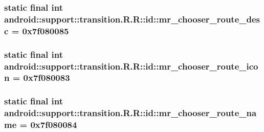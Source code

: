 \hypertarget{classandroid_1_1support_1_1transition_1_1_r_1_1id_6a5714f4a260e462ed4ed7c9c2356caa}{
\subsubsection[{mr\_\-chooser\_\-route\_\-desc}]{\setlength{\rightskip}{0pt plus 5cm}static final int android::support::transition.R.R::id::mr\_\-chooser\_\-route\_\-desc = 0x7f080085}}
\label{classandroid_1_1support_1_1transition_1_1_r_1_1id_6a5714f4a260e462ed4ed7c9c2356caa}


\hypertarget{classandroid_1_1support_1_1transition_1_1_r_1_1id_eb9712c8d46b22e7778bfad17cf43494}{
\subsubsection[{mr\_\-chooser\_\-route\_\-icon}]{\setlength{\rightskip}{0pt plus 5cm}static final int android::support::transition.R.R::id::mr\_\-chooser\_\-route\_\-icon = 0x7f080083}}
\label{classandroid_1_1support_1_1transition_1_1_r_1_1id_eb9712c8d46b22e7778bfad17cf43494}


\hypertarget{classandroid_1_1support_1_1transition_1_1_r_1_1id_221e09f6c2f01310f7316607ffb4cf28}{
\subsubsection[{mr\_\-chooser\_\-route\_\-name}]{\setlength{\rightskip}{0pt plus 5cm}static final int android::support::transition.R.R::id::mr\_\-chooser\_\-route\_\-name = 0x7f080084}}
\label{classandroid_1_1support_1_1transition_1_1_r_1_1id_221e09f6c2f01310f7316607ffb4cf28}


